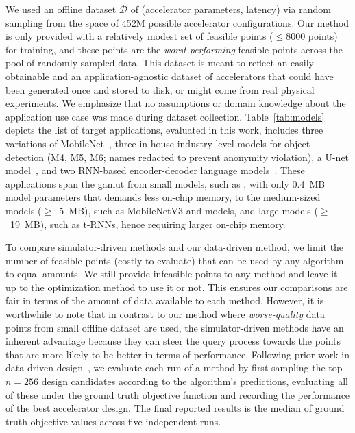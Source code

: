 %
We used an offline dataset $\mathcal{D}$ of (accelerator parameters, latency) via random sampling from the space of 452M possible accelerator configurations.
%
Our method is only provided with a relatively modest set of feasible points ($\leq 8000$ points) for training, and these points are the \emph{worst-performing} feasible points across the pool of randomly sampled data.
%
This dataset is meant to reflect an easily obtainable and an application-agnostic dataset of accelerators that could have been generated once and stored to disk, or might come from real physical experiments. 
%
We emphasize that no assumptions or domain knowledge about the application use case was made during dataset collection.
%
Table~\ref{tab:models} depicts the list of target applications, evaluated in this work, includes three variations of MobileNet~\citep{edgetpu:arxiv:2020,mnv2:arxiv:2018,mnv3:cvpr:2019}, three in-house industry-level models for object detection (M4, M5, M6; names redacted to prevent anonymity violation), a U-net model~\citep{unet}, and two RNN-based encoder-decoder language models~\citep{trnn01,trnn02,trnn03,trnn04}. 
%
These applications span the gamut from small models, such as \msix, with only 0.4~MB model parameters that demands less on-chip memory, to the medium-sized models ($\geq$~5~MB), such as MobileNetV3 and \mfour models, and large models ($\geq$~19~MB), such as t-RNNs, hence requiring larger on-chip memory. 
%


%
To compare simulator-driven methods and our data-driven method, we limit the number of feasible points (costly to evaluate) that can be used by any algorithm to equal amounts. 
%
We still provide infeasible points to any method and leave it up to the optimization method to use it or not.
% 
This ensures our comparisons are fair in terms of the amount of data available to each method.
%
However, it is worthwhile to note that in contrast to our method where \emph{worse-quality} data points from small offline dataset are used, the simulator-driven methods have an inherent advantage because they can steer the query process towards the points that are more likely to be better in terms of performance.
%
%
Following prior work in data-driven design~\citep{brookes19a}, we evaluate each run of a method by first sampling the top $n=256$ design candidates according to the algorithm's predictions, evaluating all of these under the ground truth objective function and recording the performance of the best accelerator design.
%
The final reported results is the median of ground truth objective values across five independent runs.

